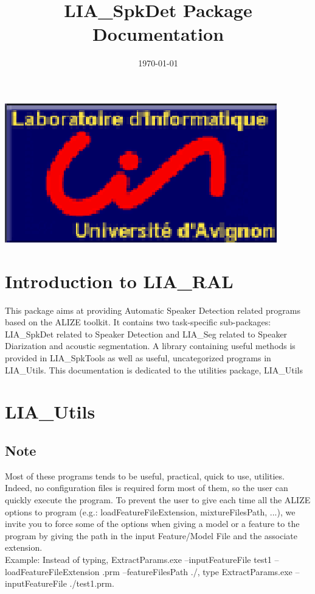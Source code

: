 \documentclass[a4paper]{article}
\date{\today}
\title{\Large\bf LIA\_SpkDet Package Documentation}
\begin{document}
\ninept
\maketitle
\href{http://www.lia.univ-avignon.fr}{\includegraphics[scale=0.8]{lia.eps}}\\

\section{Introduction to LIA\_RAL}

This package aims at providing Automatic Speaker Detection related
programs based on the ALIZE toolkit. It contains two task-specific
sub-packages: LIA\_SpkDet related to Speaker Detection and LIA\_Seg
related to Speaker Diarization and acoustic segmentation. A library
containing useful methods is provided in LIA\_SpkTools as well as
useful, uncategorized programs in LIA\_Utils. This documentation is
dedicated to the utilities package, LIA\_Utils
\section{LIA\_Utils}
\label{sec:Utils}

\subsection{Note}
Most of these programs tends to be useful, practical, quick to use, utilities. Indeed, no configuration files is required form most of them, so the user can quickly execute the program.
To prevent the user to give each time all the ALIZE options to program (e.g.: loadFeatureFileExtension, mixtureFilesPath, ...), we invite you to force some of the options when giving a model or a feature to the program by giving the path in the input Feature/Model File and the associate extension.\\
Example:
Instead of typing, ExtractParams.exe --inputFeatureFile test1 --loadFeatureFileExtension .prm --featureFilesPath ./, type  ExtractParams.exe --inputFeatureFile ./test1.prm.
\end{document}
